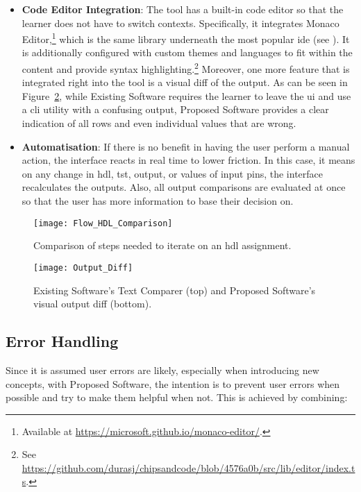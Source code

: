 \begin{itemize}
    \item \textbf{Code Editor Integration}: The tool has a built-in code editor so that the learner does not have to switch contexts. Specifically, it integrates Monaco Editor,\footnote{Available at \url{https://microsoft.github.io/monaco-editor/}.} which is the same library underneath the most popular \gls{ide} (see ). It is additionally configured with custom themes and languages to fit within the content and provide syntax highlighting.\footnote{See \url{https://github.com/durasj/chipsandcode/blob/4576a0b/src/lib/editor/index.ts}.} Moreover, one more feature that is integrated right into the tool is a visual diff of the output. As can be seen in Figure~\ref{fig:design-diff}, while Existing Software requires the learner to leave the \gls{ui} and use a \gls{cli} utility with a confusing output, Proposed Software provides a clear indication of all rows and even individual values that are wrong.
    \item \textbf{Automatisation}: If there is no benefit in having the user perform a manual action, the interface reacts in real time to lower friction. In this case, it means on any change in \gls{hdl}, \gls{tst}, output, or values of input pins, the interface recalculates the outputs. Also, all output comparisons are evaluated at once so that the user has more information to base their decision on.
\end{itemize}

\begin{figure}[H]
    \centering
    \texttt{[image: Flow\_HDL\_Comparison]}
    \caption{Comparison of steps needed to iterate on an \gls{hdl} assignment.}
    \label{fig:design-hdl-steps}
\end{figure}

\begin{figure}[H]
    \centering
    \texttt{[image: Output\_Diff]}
    \caption{Existing Software's Text Comparer (top) and Proposed Software's visual output diff (bottom).}
    \label{fig:design-diff}
\end{figure}

\subsection{Error Handling}
\label{sec:ui-error-handling}

Since it is assumed user errors are likely, especially when introducing new concepts, with Proposed Software, the intention is to prevent user errors when possible and try to make them helpful when not.
This is achieved by combining:

